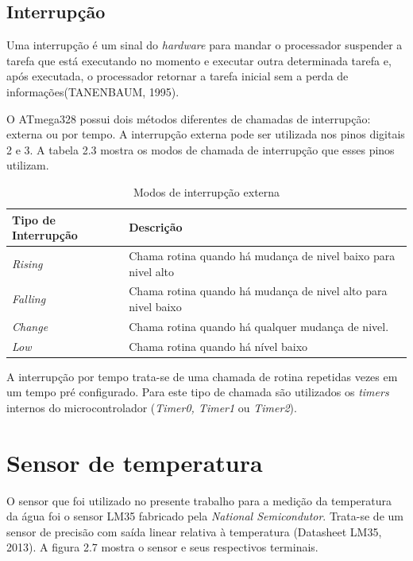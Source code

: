\subsection{Interrupção}

Uma interrupção é um sinal do \textit{hardware} para mandar o processador suspender a tarefa que está executando no momento e executar outra determinada tarefa e,  após executada, o processador retornar a tarefa inicial sem a perda de informações(TANENBAUM, 1995).

O ATmega328 possui dois métodos diferentes de chamadas de interrupção: externa ou por tempo. A interrupção externa pode ser utilizada nos pinos digitais 2 e 3. A tabela 2.3 mostra os modos de chamada de interrupção que esses pinos utilizam.

\begin{table}[!hbt] 
   \centering   %
   \setlength{\arrayrulewidth}{1\arrayrulewidth}
   \setlength{\belowcaptionskip}{5pt}
   
   \caption{Modos de interrupção externa}
   \begin{tabular}{l|l} %
   \hline
    \textbf{Tipo de Interrupção} &\textbf{Descrição}  \\
    \hline
    \textit{Rising} & Chama rotina quando há mudança de nivel baixo para nivel alto\\
    \hline
    \textit{Falling} &Chama rotina quando há mudança de nivel alto para nivel baixo\\
    \hline
    \textit{Change} & Chama rotina quando há qualquer mudança de nivel.\\
    \hline
    \textit{Low} & Chama rotina quando há nível baixo\\
   \end{tabular}
   \label{Modos de interrupção externa}
\end{table}

A interrupção por tempo trata-se de uma chamada de rotina repetidas vezes em um tempo pré configurado. Para este tipo de chamada são utilizados os  \textit{timers} internos do microcontrolador (\textit{Timer0, Timer1} ou \textit{Timer2}).

\section{Sensor de temperatura}

O sensor que foi utilizado no presente trabalho para a medição da temperatura da água foi o sensor LM35 fabricado pela \textit{National Semicondutor}. Trata-se de um sensor de precisão com saída linear relativa à temperatura (Datasheet LM35, 2013). A figura 2.7 mostra o sensor e seus respectivos terminais.

